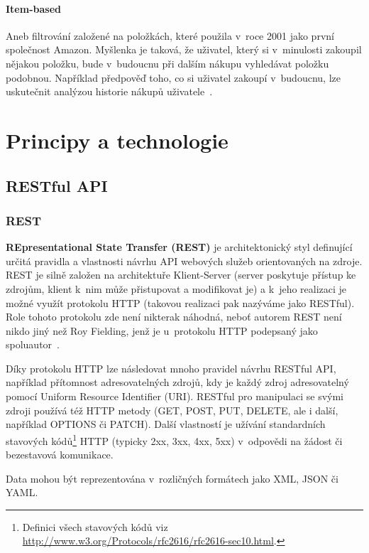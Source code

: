 \documentclass[thesis=M,czech]{FITthesis}[2014/05/07]
\begin{document}
\paragraph{Item-based}

Aneb filtrování založené na položkách, které použila v~roce 2001 jako první společnost Amazon. Myšlenka je taková, že uživatel, který si v~minulosti zakoupil nějakou položku, bude v~budoucnu při dalším nákupu vyhledávat položku podobnou. Například předpověď toho, co si uživatel zakoupí v~budoucnu, lze uskutečnit analýzou historie nákupů uživatele~\cite{itemcf}. 

\section{Principy a technologie}
\label{sec:sysanalys}

\subsection{RESTful API}
\label{rest}
\subsubsection{REST}
\textbf{REpresentational State Transfer (REST)} je architektonický styl definující určitá pravidla a vlastnosti návrhu API webových služeb orientovaných na zdroje. REST je silně založen na architektuře Klient-Server (server poskytuje přístup ke zdrojům, klient k~nim může přistupovat a modifikovat je) a k~jeho realizaci je možné využít protokolu HTTP (takovou realizaci pak nazýváme jako RESTful). Role tohoto protokolu zde není nikterak náhodná, neboť autorem REST není nikdo jiný než Roy Fielding, jenž je u~protokolu HTTP podepsaný jako spoluautor~\cite{Fielding:2000:ASD:932295}. 

Díky protokolu HTTP lze následovat mnoho pravidel návrhu RESTful API, například přítomnost adresovatelných zdrojů, kdy je každý zdroj adresovatelný pomocí Uniform Resource Identifier (URI). RESTful pro manipulaci se svými zdroji používá též HTTP metody (GET, POST, PUT, DELETE, ale i další, například OPTIONS či PATCH). Další vlastností je užívání standardních stavových kódů\footnote{Definici všech stavových kódů viz \url{http://www.w3.org/Protocols/rfc2616/rfc2616-sec10.html}.} HTTP (typicky 2xx, 3xx, 4xx, 5xx) v~odpovědi na žádost či bezestavová komunikace.

Data mohou být reprezentována v~rozličných formátech jako XML, JSON či YAML.
\end{document}
